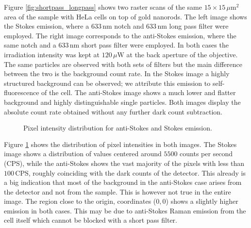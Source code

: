 \documentclass[journal=nalefd,manuscript=letter]{achemso}
\newcommand{\nm}{\ensuremath{\,\textrm{nm}}}
\newcommand{\um}{\ensuremath{\,\mu\textrm{m}}}
\newcommand{\uW}{\ensuremath{\,\mu\textrm{W}}}
\newcommand{\CPS}{\ensuremath{\,\textrm{CPS}}}
\begin{document}
Figure \ref{fig:shortpass_longpass} shows two raster scans of the same
$15\times15\um^2$ area of the sample with HeLa cells on top of gold
nanorods. The left image shows the Stokes emission, where a $633\nm$ notch and
$633\nm$ long pass filter were employed. The right image corresponds to the
anti-Stokes emission, where the same notch and a $633\nm$ short pass filter were
employed. In both cases the irradiation intensity was kept at $120\uW$ at
the back aperture of the objective. The same particles are observed with both sets
of filters but the main difference between the two is the background count rate.
In the Stokes image a highly structured background can be observed; we
attribute this emission to self-fluorescence of the cell. The anti-Stokes
image shows a much lower and flatter background and highly distinguishable
single particles. Both images display the absolute count rate obtained without any
further dark count subtraction. 

\begin{figure}[htp]
\centering
	\caption{Pixel intensity distribution for anti-Stokes and Stokes emission.}
	\label{fig:distribution_pixels}
\end{figure}

Figure \ref{fig:distribution_pixels} shows the distribution of pixel intensities
in both images. The Stokes image shows a distribution of values centered around
$5500$ counts per second (CPS), while the anti-Stokes shows the vast majority of
the pixels with less than $100\CPS$, roughly coinciding with the dark counts of
the detector. This already is a big indication that most of the background in
the anti-Stokes case arises from the detector and not from the sample. This is
however not true in the entire image. The region close to the origin,
coordinates ($0,0$) shows a slightly higher emission in both cases. This may be
due to anti-Stokes Raman emission from the cell itself which cannot be
blocked with a short pass filter.
\end{document}
